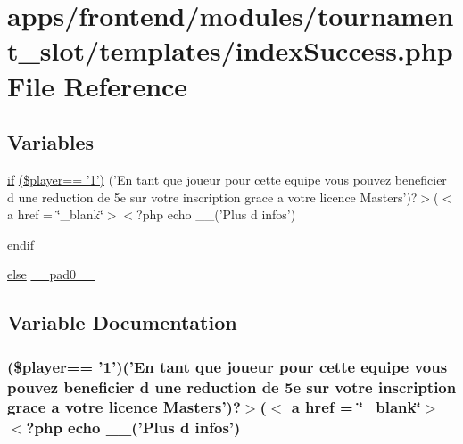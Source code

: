 \hypertarget{frontend_2modules_2tournament__slot_2templates_2index_success_8php}{\section{apps/frontend/modules/tournament\-\_\-slot/templates/index\-Success.php File Reference}
\label{frontend_2modules_2tournament__slot_2templates_2index_success_8php}
}
\subsection*{Variables}
\begin{DoxyCompactItemize}
\item 
\hyperlink{live_2modules_2tournament_2templates_2__form_team_8php_ae30a307b320d8da5d9a945eaf68f7549}{if} \hyperlink{frontend_2modules_2tournament__slot_2templates_2index_success_8php_a2f78261e5cf79134075732b4dea02645}{(\$player== '1')} ('En tant que joueur pour cette equipe vous pouvez beneficier d une reduction de 5e sur votre inscription grace a votre licence Masters')?$>$($<$ a href = \char`\"{}\-\_\-blank\char`\"{}$>$$<$?php echo \-\_\-\-\_\-('Plus d infos')
\item 
\hyperlink{frontend_2modules_2tournament__slot_2templates_2index_success_8php_ad0f54803f81be8eb0b4f23a5091c4d83}{endif}
\item 
\hyperlink{live_2modules_2team_2templates_2management_success_8php_a0544c3fe466e421738dae463968b70ba}{else} \hyperlink{frontend_2modules_2tournament__slot_2templates_2index_success_8php_a8e01dcc96c43199448ee66f7c2ae8ea6}{\-\_\-\-\_\-pad0\-\_\-\-\_\-}
\end{DoxyCompactItemize}


\subsection{Variable Documentation}
\hypertarget{frontend_2modules_2tournament__slot_2templates_2index_success_8php_a2f78261e5cf79134075732b4dea02645}{
\subsubsection[{(\$player== '1')}]{ (\$player== '1')('En tant que joueur pour cette equipe vous pouvez beneficier d une reduction de 5e sur votre inscription grace a votre licence Masters')?$>$($<$ a href = \char`\"{}\-\_\-blank\char`\"{}$>$$<$?php echo \-\_\-\-\_\-('Plus d infos')}}\label{frontend_2modules_2tournament__slot_2templates_2index_success_8php_a2f78261e5cf79134075732b4dea02645}


